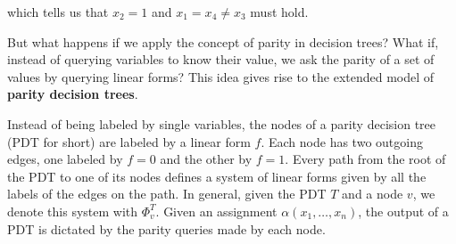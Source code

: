 \noindent
which tells us that $x_2 = 1$ and $x_1 = x_4 \neq x_3$ must hold.

\newpage

But what happens if we apply the concept of parity in decision trees? What if, instead of querying variables to know their value, we ask the parity of a set of values by querying linear forms? This idea gives rise to the extended model of \textbf{parity decision trees}.

Instead of being labeled by single variables, the nodes of a parity decision tree (PDT for short) are labeled by a linear form $f$. Each node has two outgoing edges, one labeled by $f = 0$ and the other by $f = 1$. Every path from the root of the PDT to one of its nodes defines a system of linear forms given by all the labels of the edges on the path. In general, given the PDT $T$ and a node $v$, we denote this system with $\Phi_v^T$. Given an assignment $\alpha(x_1, \ldots, x_n)$, the output of a PDT is dictated by the parity queries made by each node.

